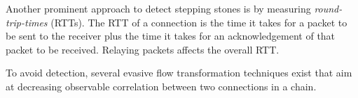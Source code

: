 \documentclass[runningheads,11pt]{llncs}\usepackage[]{graphicx}\usepackage[]{color}
\begin{document}

Another prominent approach to detect stepping stones is by measuring  \textit{round-trip-times} (RTTs). The RTT of a connection is the time it takes for a packet to be sent to the receiver plus the time it takes for an acknowledgement of that packet to be received. Relaying packets affects the overall RTT.









To avoid detection, several evasive flow transformation techniques exist that aim at decreasing observable correlation between two connections in a chain. 
\end{document}
